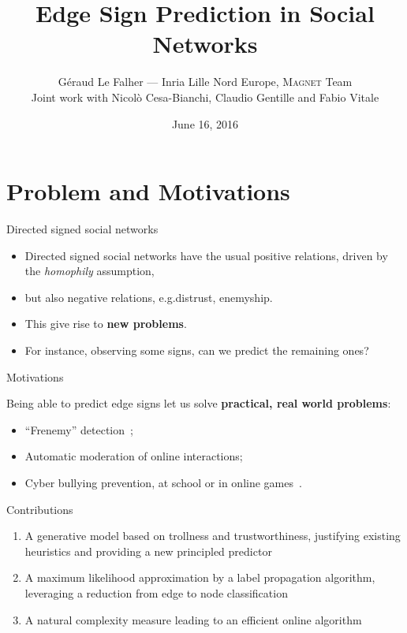 \documentclass[10pt,svgnames,ignorenonframetext,final]{beamer}
\title{Edge Sign Prediction in Social Networks}
\author{Géraud Le Falher --- Inria Lille Nord Europe, \textsc{Magnet} Team\\
  Joint work with Nicolò Cesa-Bianchi, Claudio Gentille and Fabio Vitale}
\date{June 16, 2016}
\providecommand{\largelist}{%
  \setlength{\itemsep}{8pt}\setlength{\parskip}{3pt}}
\begin{document}
\frame{\titlepage}


\section{Problem and Motivations}\label{introduction}

\begin{frame}{Directed signed social networks}

  \begin{itemize}
    \largelist
    \item
      Directed signed social networks have the usual positive relations,
      driven by the \emph{homophily} assumption,
    \item
      but also \alert{negative relations}, e.g.\@ distrust, enemyship.
    \item
      This give rise to \textbf{new problems}.
    \item
      For instance, observing some signs, can we predict the remaining ones?
  \end{itemize}

\end{frame}

\begin{frame}{Motivations}

  Being able to predict edge signs let us solve \textbf{practical, real world problems}:

  \begin{itemize}
    \largelist
  \item
    ``Frenemy'' detection~\autocite{frenemy12};
  \item
    Automatic moderation of online interactions;
  \item
    Cyber bullying prevention, at school or in online games~\autocite{CyberbullyingCHI15}.
\end{itemize}

\end{frame}

\begin{frame}{Contributions}

  \begin{enumerate}
    \def\labelenumi{\arabic{enumi}.}
    \largelist
  \item
    A \alert{generative model} based on trollness and trustworthiness, justifying
    existing heuristics and providing a \alert{new principled predictor}
  \item
    A maximum likelihood approximation by a \alert{label propagation algorithm},
    leveraging a reduction from \alert{edge to node classification}
  \item
    A \alert{natural complexity measure} leading to an \alert{efficient online algorithm}
\end{enumerate}

\end{frame}
\end{document}
